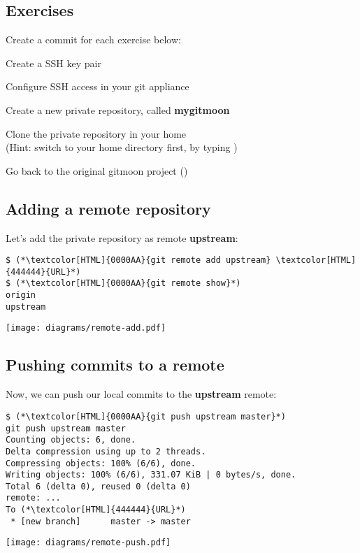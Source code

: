 \subsection{Exercises}
\begin{frame}[fragile]
  \subslidetitle
  Create a commit for each exercise below:
  \begin{exercise}
    \item Create a SSH key pair
    \item Configure SSH access in your git appliance
    \item Create a new private repository, called \textbf{mygitmoon}
    \item Clone the private repository in your home \\
      (Hint: switch to your home directory first, by typing )
    \item Go back to the original gitmoon project ()
  \end{exercise}
\end{frame}

\subsection{Adding a remote repository}
\begin{frame}[fragile]
  \subslidetitle
  Let's add the private repository as remote \textbf{upstream}:
  \begin{lstlisting}
$ (*\textcolor[HTML]{0000AA}{git remote add upstream} \textcolor[HTML]{444444}{URL}*)
$ (*\textcolor[HTML]{0000AA}{git remote show}*)
origin
upstream
\end{lstlisting}
\vspace{1em}
\center \texttt{[image: diagrams/remote-add.pdf]}
\end{frame}

\subsection{Pushing commits to a remote}
\begin{frame}[fragile]
  \subslidetitle
  Now, we can push our local commits to the \textbf{upstream} remote:
  \begin{lstlisting}
$ (*\textcolor[HTML]{0000AA}{git push upstream master}*)
git push upstream master
Counting objects: 6, done.
Delta compression using up to 2 threads.
Compressing objects: 100% (6/6), done.
Writing objects: 100% (6/6), 331.07 KiB | 0 bytes/s, done.
Total 6 (delta 0), reused 0 (delta 0)
remote: ...
To (*\textcolor[HTML]{444444}{URL}*)
 * [new branch]      master -> master
\end{lstlisting}
\center \texttt{[image: diagrams/remote-push.pdf]}
\end{frame}

